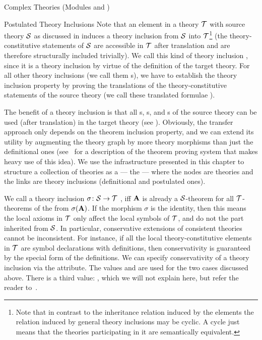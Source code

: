 \begin{tchapter}[id=complex-theories,short=Complex Theories]{Complex Theories (Modules
    {} and {})}
\begin{tsection}[id=theory-inclusions]{Postulated Theory Inclusions}
  Note that an {} element in a theory ${\cal T}$ with source theory ${\cal S}$ as
  discussed in {} induces a theory inclusion from ${\cal S}$ into
  ${\cal T}$\footnote{Note that in contrast to the inheritance relation induced by the
    {} elements the relation induced by general theory inclusions may be
    cyclic. A cycle just means that the theories participating in it are semantically
    equivalent.} (the theory-constitutive statements of ${\cal S}$ are
  accessible in ${\cal T}$ after translation and are therefore structurally included
  trivially).  We call this kind of theory inclusion
  {}, since it is a theory
  inclusion by virtue of the definition of the target theory.  For all other theory
  inclusions (we call them {s}), we have to
  establish the theory inclusion property by proving the translations of the
  theory-constitutive statements of the source theory (we call these translated formulae
  {}).

  The benefit of a theory inclusion is that all {s},
  {s}, and {s} of the source theory can be used
  (after translation) in the target theory (see {}).
  Obviously, the transfer approach only depends on the theorem inclusion property, and we
  can extend its utility by augmenting the theory graph by more theory morphisms than just
  the definitional ones (see~\cite{FaGu93} for a description of the {\imps} theorem
  proving system that makes heavy use of this idea).  We use the infrastructure presented
  in this chapter to structure a collection of theories as a {} --- the
  {} --- where the nodes are theories and the links are theory
  inclusions (definitional and postulated ones).

  We call a theory inclusion $\sigma\colon{\cal S}\to{\cal T}$ {}, iff ${\bf A}$ is
  already a ${\cal S}$-theorem for all ${\cal T}$-theorems of the from $\sigma({\bf A})$. If the
  morphism $\sigma$ is the identity, then this means the local axioms in ${\cal T}$ only affect
  the local symbols of ${\cal T}$, and do not the part inherited from ${\cal S}$. In particular,
  conservative extensions of consistent theories cannot be inconsistent. For instance, if
  all the local theory-constitutive elements in ${\cal T}$ are symbol declarations with
  definitions, then conservativity is guaranteed by the special form of the
  definitions. We can specify conservativity of a theory inclusion via the
  {} attribute. The values
  {} and
  {} are used for the two cases discussed
  above. There is a third value: {}, which we
  will not explain here, but refer the reader to~\cite{MAH-06-a}.


\end{tsection}
\end{tchapter}

